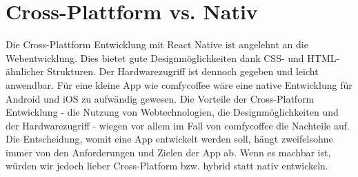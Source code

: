 \section{Cross-Plattform vs. Nativ}
Die Cross-Plattform Entwicklung mit React Native ist angelehnt an die Webentwicklung. Dies bietet gute Designmöglichkeiten dank CSS- und HTML-ähnlicher Strukturen. Der Hardwarezugriff ist dennoch gegeben und leicht anwendbar. Für eine kleine App wie comfycoffee wäre eine native Entwicklung für Android und iOS zu aufwändig gewesen. Die Vorteile der Cross-Platform Entwicklung - die Nutzung von Webtechnologien, die Designmöglichkeiten und der Hardwarezugriff - wiegen vor allem im Fall von comfycoffee die Nachteile auf. Die Entscheidung, womit eine App entwickelt werden soll, hängt zweifelsohne immer von den Anforderungen und Zielen der App ab. Wenn es machbar ist, würden wir jedoch lieber Cross-Platform bzw. hybrid statt nativ entwickeln.
